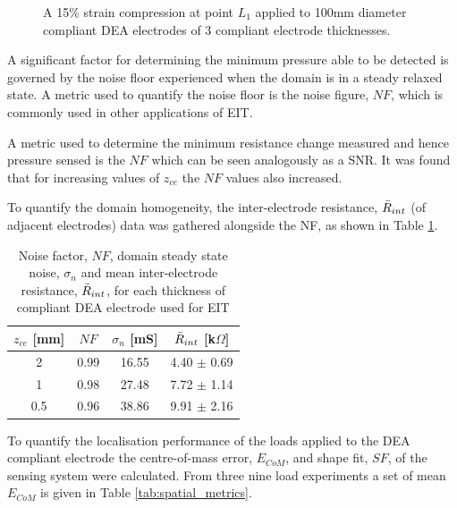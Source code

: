 \begin{figure}[H]
		\hspace{0.2cm}
		\vspace{0.2cm}
		\caption{A 15\% strain compression at point $L_1$ applied to 100mm diameter compliant DEA electrodes of 3 compliant electrode thicknesses.}
		\label{fig:EIT_thickness_compare}
	\end{figure}
	A significant factor for determining the minimum pressure able to be detected is governed by the noise floor experienced when the domain is in a steady relaxed state. A metric used to quantify the noise floor is the noise figure, $N\!F$, which is commonly used in other applications\cite{Adler2009, Ellingham2024} of EIT.

 	A metric used to determine the minimum resistance change measured and hence pressure sensed is the $N\!F$ which can be seen analogously as a SNR. It was found that for increasing values of $z_{ce}$ the $N\!F$ values also increased.
 
    To quantify the domain homogeneity, the inter-electrode resistance, $\Bar{R}_{int}$ (of adjacent electrodes) data was gathered alongside the NF, as shown in Table \ref{tab:NF_vals}.
	\begin{table}[H]
		\centering
		\caption{Noise factor, $N\!F$, domain steady state noise, $\sigma_n$ and mean inter-electrode resistance, $\Bar{R}_{int}$, for each thickness of compliant DEA electrode used for EIT}
		\label{tab:NF_vals}
		\begin{tabular}{c|c|c|c}
			$z_{ce}$ [mm] & $N\!F$ & $\sigma_n$ [mS] & $\Bar{R}_{int}$ [k$\Omega$]\\
			\hline
			2 & 0.99 & 16.55 & 4.40 $\pm$ 0.69 \\
			1 & 0.98 & 27.48 & 7.72 $\pm$ 1.14\\
			0.5 & 0.96 & 38.86 & 9.91 $\pm$ 2.16\\
		\end{tabular}
	\end{table}
	To quantify the localisation performance of the loads applied to the DEA compliant electrode the centre-of-mass error, $E_{CoM}$, and shape fit, $S\!F$, of the sensing system were calculated. From three nine load experiments a set of mean $E_{CoM}$ is given in Table \ref{tab:spatial_metrics}. 

